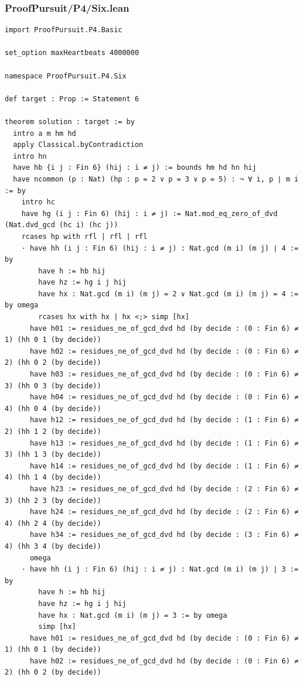 \documentclass[11pt,a4paper]{article}
\begin{document}
\subsubsection{ProofPursuit/P4/Six.lean}\label{proofpursuitp4six.lean}

\begin{Verbatim}[breaklines,breakanywhere,fontsize=\footnotesize]
import ProofPursuit.P4.Basic

set_option maxHeartbeats 4000000

namespace ProofPursuit.P4.Six

def target : Prop := Statement 6

theorem solution : target := by
  intro a m hm hd
  apply Classical.byContradiction
  intro hn
  have hb {i j : Fin 6} (hij : i ≠ j) := bounds hm hd hn hij
  have ncommon (p : Nat) (hp : p = 2 ∨ p = 3 ∨ p = 5) : ¬ ∀ i, p ∣ m i := by
    intro hc
    have hg (i j : Fin 6) (hij : i ≠ j) := Nat.mod_eq_zero_of_dvd (Nat.dvd_gcd (hc i) (hc j))
    rcases hp with rfl | rfl | rfl
    · have hh (i j : Fin 6) (hij : i ≠ j) : Nat.gcd (m i) (m j) ∣ 4 := by
        have h := hb hij
        have hz := hg i j hij
        have hx : Nat.gcd (m i) (m j) = 2 ∨ Nat.gcd (m i) (m j) = 4 := by omega
        rcases hx with hx | hx <;> simp [hx]
      have h01 := residues_ne_of_gcd_dvd hd (by decide : (0 : Fin 6) ≠ 1) (hh 0 1 (by decide))
      have h02 := residues_ne_of_gcd_dvd hd (by decide : (0 : Fin 6) ≠ 2) (hh 0 2 (by decide))
      have h03 := residues_ne_of_gcd_dvd hd (by decide : (0 : Fin 6) ≠ 3) (hh 0 3 (by decide))
      have h04 := residues_ne_of_gcd_dvd hd (by decide : (0 : Fin 6) ≠ 4) (hh 0 4 (by decide))
      have h12 := residues_ne_of_gcd_dvd hd (by decide : (1 : Fin 6) ≠ 2) (hh 1 2 (by decide))
      have h13 := residues_ne_of_gcd_dvd hd (by decide : (1 : Fin 6) ≠ 3) (hh 1 3 (by decide))
      have h14 := residues_ne_of_gcd_dvd hd (by decide : (1 : Fin 6) ≠ 4) (hh 1 4 (by decide))
      have h23 := residues_ne_of_gcd_dvd hd (by decide : (2 : Fin 6) ≠ 3) (hh 2 3 (by decide))
      have h24 := residues_ne_of_gcd_dvd hd (by decide : (2 : Fin 6) ≠ 4) (hh 2 4 (by decide))
      have h34 := residues_ne_of_gcd_dvd hd (by decide : (3 : Fin 6) ≠ 4) (hh 3 4 (by decide))
      omega
    · have hh (i j : Fin 6) (hij : i ≠ j) : Nat.gcd (m i) (m j) ∣ 3 := by
        have h := hb hij
        have hz := hg i j hij
        have hx : Nat.gcd (m i) (m j) = 3 := by omega
        simp [hx]
      have h01 := residues_ne_of_gcd_dvd hd (by decide : (0 : Fin 6) ≠ 1) (hh 0 1 (by decide))
      have h02 := residues_ne_of_gcd_dvd hd (by decide : (0 : Fin 6) ≠ 2) (hh 0 2 (by decide))

\end{Verbatim}
\end{document}
